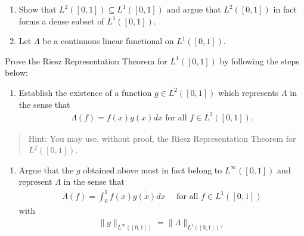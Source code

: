 \begin{enumerate}
\def\labelenumi{\alph{enumi}.}
\item
  Show that \(L^2([0, 1]) ⊆ L^1([0, 1])\) and argue that \(L^2([0, 1])\)
  in fact forms a dense subset of \(L^1([0, 1])\).
\item
  Let \(Λ\) be a continuous linear functional on \(L^1([0, 1])\).
\end{enumerate}

Prove the Riesz Representation Theorem for \(L^1([0, 1])\) by following
the steps below:

\begin{enumerate}
\def\labelenumi{\roman{enumi}.}
\tightlist
\item
  Establish the existence of a function \(g ∈ L^2([0, 1])\) which
  represents \(Λ\) in the sense that
  \begin{align*}
    Λ(f ) = f (x)g(x) dx \text{ for all } f ∈ L^2([0, 1]).
    \end{align*}
\end{enumerate}

\begin{quote}
Hint: You may use, without proof, the Riesz Representation Theorem for
\(L^2([0, 1])\).
\end{quote}

\begin{enumerate}
\def\labelenumi{\roman{enumi}.}
\setcounter{enumi}{1}
\tightlist
\item
  Argue that the \(g\) obtained above must in fact belong to
  \(L^∞([0, 1])\) and represent \(Λ\) in the sense that
  \begin{align*}
    \Lambda(f)=\int_{0}^{1} f(x) \overline{g(x)} d x \quad \text { for all } f \in L^{1}([0,1])
    \end{align*}
  with
  \begin{align*}
    \|g\|_{L^{\infty}([0,1])} = \|\Lambda\|_{L^{1}([0,1]) {}^{ \vee }}
    \end{align*}
\end{enumerate}

